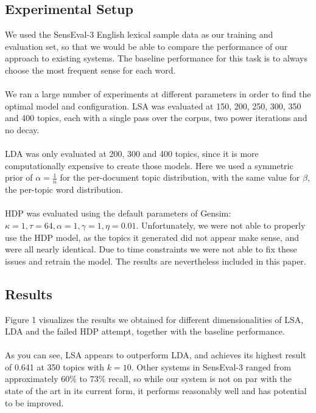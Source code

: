 \subsection{Experimental Setup}
We used the SensEval-3 English lexical sample data as our training and evaluation set, so that we would be able to compare the performance of our approach to existing systems. The baseline performance for this task is to always choose the most frequent sense for each word.\\\\
We ran a large number of experiments at different parameters in order to find the optimal model and configuration. LSA was evaluated at 150, 200, 250, 300, 350 and 400 topics, each with a single pass over the corpus, two power iterations and no decay.\\\\
LDA was only evaluated at 200, 300 and 400 topics, since it is more computationally expensive to create those models. Here we used a symmetric prior of $\alpha = \frac{1}{n}$ for the per-document topic distribution, with the same value for $\beta$, the per-topic word distribution.\\\\
HDP was evaluated using the default parameters of Gensim: $\kappa = 1, \tau = 64, \alpha =1, \gamma =1, \eta =0.01$. Unfortunately, we were not able to properly use the HDP model, as the topics it generated did not appear make sense, and were all nearly identical. Due to time constraints we were not able to fix these issues and retrain the model. The results are nevertheless included in this paper.\\
\subsection{Results}
Figure 1 visualizes the results we obtained for different dimensionalities of LSA, LDA and the failed HDP attempt, together with the baseline performance. \\\\
As you can see, LSA appears to outperform LDA, and achieves its highest result of 0.641 at 350 topics with $k=10$. Other systems in SensEval-3 ranged from approximately 60\% to 73\% recall\cite{senseval3paper}, so while our system is not on par with the state of the art in its current form, it performs reasonably well and has potential to be improved. 

